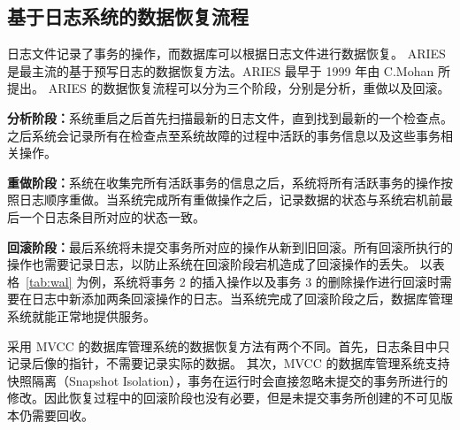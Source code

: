 \subsection{基于日志系统的数据恢复流程}

日志文件记录了事务的操作，而数据库可以根据日志文件进行数据恢复。
ARIES 是最主流的基于预写日志的数据恢复方法。ARIES 最早于 1999 年由 C.Mohan 所提出\cite{mohan_aries_1992}。
ARIES 的数据恢复流程可以分为三个阶段，分别是分析，重做以及回滚。

\textbf{分析阶段：}系统重启之后首先扫描最新的日志文件，直到找到最新的一个检查点。之后系统会记录所有在检查点至系统故障的过程中活跃的事务信息以及这些事务相关操作。


\textbf{重做阶段：}系统在收集完所有活跃事务的信息之后，系统将所有活跃事务的操作按照日志顺序重做。当系统完成所有重做操作之后，记录数据的状态与系统宕机前最后一个日志条目所对应的状态一致。

\textbf{回滚阶段：}最后系统将未提交事务所对应的操作从新到旧回滚。所有回滚所执行的操作也需要记录日志，以防止系统在回滚阶段宕机造成了回滚操作的丢失。
以表格~\ref{tab:wal} 为例，系统将事务 2 的插入操作以及事务 3 的删除操作进行回滚时需要在日志中新添加两条回滚操作的日志。当系统完成了回滚阶段之后，数据库管理系统就能正常地提供服务。

采用 MVCC 的数据库管理系统的数据恢复方法有两个不同。首先，日志条目中只记录后像的指针，不需要记录实际的数据。
其次，MVCC 的数据库管理系统支持快照隔离（Snapshot Isolation），事务在运行时会直接忽略未提交的事务所进行的修改。因此恢复过程中的回滚阶段也没有必要，但是未提交事务所创建的不可见版本仍需要回收。







